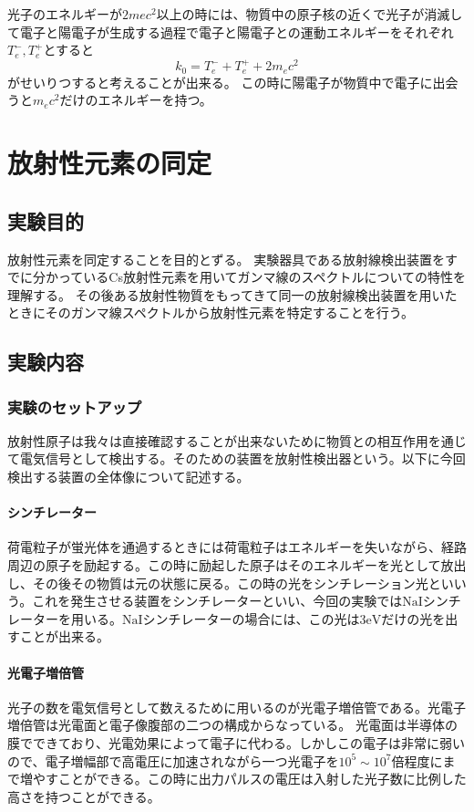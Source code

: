 \documentclass[titlepage]{ltjsarticle}
\begin{document}
光子のエネルギーが\(2mec^2\)以上の時には、物質中の原子核の近くで光子が消滅して電子と陽電子が生成する過程で電子と陽電子との運動エネルギーをそれぞれ\(T^-_e,T^+_e\)とすると
\begin{equation}
  k_0 = T^-_e + T^+_e + 2m_e c^2
\end{equation}
がせいりつすると考えることが出来る。
この時に陽電子が物質中で電子に出会うと\(m_ec^2\)だけのエネルギーを持つ。


\section{放射性元素の同定}

\subsection{実験目的}

放射性元素を同定することを目的とずる。
実験器具である放射線検出装置をすでに分かっているCs放射性元素を用いてガンマ線のスペクトルについての特性を理解する。
その後ある放射性物質をもってきて同一の放射線検出装置を用いたときにそのガンマ線スペクトルから放射性元素を特定することを行う。


\subsection{実験内容}
\subsubsection{実験のセットアップ}

放射性原子は我々は直接確認することが出来ないために物質との相互作用を通じて電気信号として検出する。そのための装置を放射性検出器という。以下に今回検出する装置の全体像について記述する。



\paragraph{シンチレーター}
荷電粒子が蛍光体を通過するときには荷電粒子はエネルギーを失いながら、経路周辺の原子を励起する。この時に励起した原子はそのエネルギーを光として放出し、その後その物質は元の状態に戻る。この時の光をシンチレーション光といいう。これを発生させる装置をシンチレーターといい、今回の実験では\(\mathrm{NaI}\)シンチレーターを用いる。\(\mathrm{NaI}\)シンチレーターの場合には、この光は\(3 \mathrm{eV}\)だけの光を出すことが出来る。

\paragraph{光電子増倍管}
光子の数を電気信号として数えるために用いるのが光電子増倍管である。光電子増倍管は光電面と電子像腹部の二つの構成からなっている。
光電面は半導体の膜でできており、光電効果によって電子に代わる。しかしこの電子は非常に弱いので、電子増幅部で高電圧に加速されながら一つ光電子を\(10^5\sim 10^7\)倍程度にまで増やすことができる。この時に出力パルスの電圧は入射した光子数に比例した高さを持つことができる。
\end{document}
